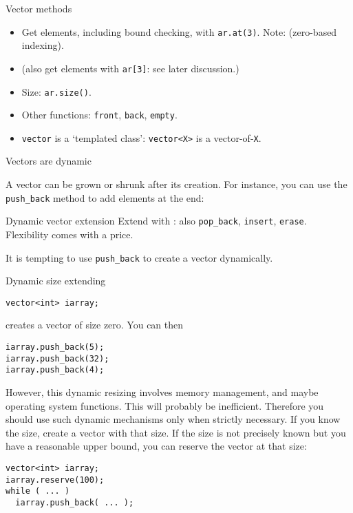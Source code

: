 \begin{slide}{Vector methods}
  \label{sl:vector-method}
  \begin{itemize}
  \item Get elements, including bound checking, with
    \lstinline{ar.at(3)}.
    Note: (zero-based indexing).
  \item (also get elements with \lstinline{ar[3]}: see later discussion.)
  \item Size: \lstinline{ar.size()}.
  \item Other functions: \lstinline{front}, \lstinline{back}, \lstinline{empty}.
  \item \lstinline{vector} is a `templated class':
    \lstinline{vector<X>} is a vector-of-\lstinline{X}.
  \end{itemize}
\end{slide}

 {Vectors are dynamic}
\label{sec:stdvector-dynamic}

A vector
can be grown or shrunk after its creation.
For instance, you can use the \lstinline{push_back} method to add elements at the end:

\begin{block}{Dynamic vector extension}
  \label{sl:vector-dynamic}
  Extend with :
  also \lstinline{pop_back}, \lstinline{insert}, \lstinline{erase}.\\
  Flexibility comes with a price.
\end{block}

It is tempting to use \lstinline{push_back} to create a vector dynamically.

\begin{block}{Dynamic size extending}
  \label{sl:vector-extend}
\begin{lstlisting}
vector<int> iarray;
\end{lstlisting}
creates a vector of size zero. You can then
\begin{lstlisting}
iarray.push_back(5);
iarray.push_back(32);
iarray.push_back(4);
\end{lstlisting}
\end{block}

However, this dynamic resizing involves memory management, and maybe
operating system functions. This will probably be
inefficient. Therefore you should use such dynamic mechanisms only
when strictly necessary.
If you know the size,
create a vector with that size. If the size is not precisely known but
you have a reasonable upper bound, you can 
reserve the vector at that size:
\begin{lstlisting}
vector<int> iarray;
iarray.reserve(100);
while ( ... )
  iarray.push_back( ... );
\end{lstlisting}

